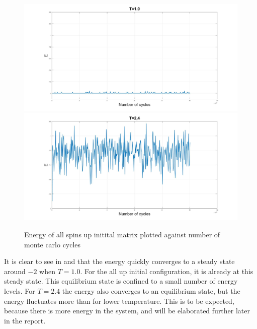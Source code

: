 \documentclass[10pt,a4paper]{article}
\begin{document}
\begin{figure} [H]
\centerline{
\includegraphics[scale=0.15]{UPenergy1.jpg}
\includegraphics[scale=0.15]{UPenergy24.jpg}
}
\caption{Energy of all spins up initital matrix plotted against number of monte carlo cycles}
\label{fig:UpEnergy}
\end{figure}

\noindent It is clear to see in  and  that the energy quickly converges to a steady state around $-2$ when $T=1.0$. For the all up initial configuration, it is already at this steady state. This equilibrium state is confined to a small number of energy levels. For $T=2.4$ the energy also converges to an equilibrium state, but the energy fluctuates more than for lower temperature. This is to be expected, because there is more energy in the system, and will be elaborated further later in the report. 
\end{document}
